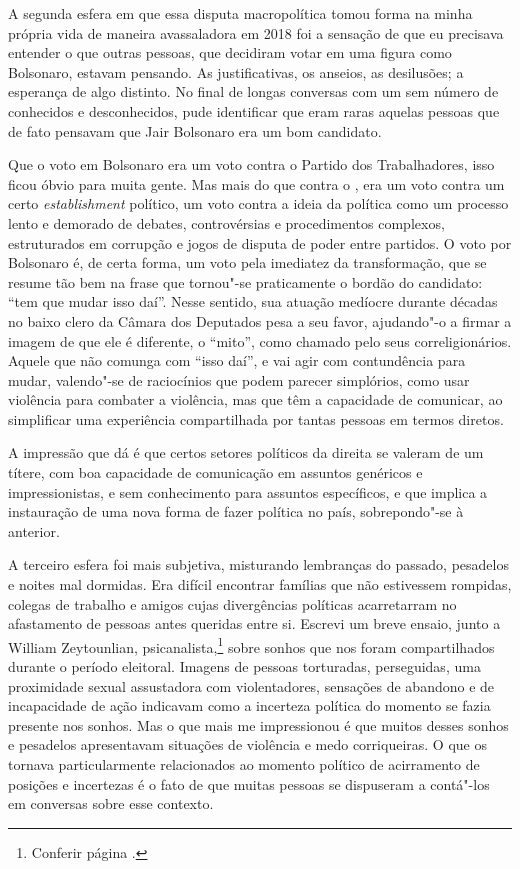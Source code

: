 A segunda esfera em que essa disputa macropolítica tomou forma na minha
própria vida de maneira avassaladora em 2018 foi a sensação de que eu
precisava entender o que outras pessoas, que decidiram votar em uma
figura como Bolsonaro, estavam pensando. As justificativas, os anseios,
as desilusões; a esperança de algo distinto. No final de longas
conversas com um sem número de conhecidos e desconhecidos, pude
identificar que eram raras aquelas pessoas que de fato pensavam que Jair
Bolsonaro era um bom candidato.

Que o voto em Bolsonaro era um voto contra o Partido dos Trabalhadores,
isso ficou óbvio para muita gente.
Mas mais do que contra o , era um voto contra um
certo \emph{establishment} político, um voto contra a ideia da política
como um processo lento e demorado de debates, controvérsias e
procedimentos complexos, estruturados em corrupção e jogos de disputa de
poder entre partidos. O voto por Bolsonaro é, de certa forma, um voto
pela imediatez da transformação, que se resume tão bem na frase que
tornou"-se praticamente o bordão do candidato: ``tem que mudar isso
daí''. Nesse sentido, sua atuação medíocre durante décadas no baixo
clero da Câmara dos Deputados pesa a seu favor, ajudando"-o a firmar a imagem de que
ele é diferente, o ``mito'', como chamado pelo seus correligionários.
Aquele que não comunga com ``isso daí'', e vai agir com contundência para
mudar, valendo"-se de raciocínios que podem parecer simplórios, como usar
violência para combater a violência, mas que têm a capacidade de
comunicar, ao simplificar uma experiência compartilhada por tantas
pessoas em termos diretos.

A impressão que dá é que certos setores
políticos da direita se valeram de um títere, com boa capacidade de
comunicação em assuntos genéricos e impressionistas, e sem conhecimento
para assuntos específicos, e que implica a instauração de uma nova
forma de fazer política no país, sobrepondo"-se à anterior.

A terceiro esfera foi mais subjetiva, misturando lembranças do passado,
pesadelos e noites mal dormidas. Era difícil encontrar famílias que não
estivessem rompidas, colegas de trabalho e amigos cujas divergências
políticas acarretarram no afastamento de pessoas antes queridas entre si.
Escrevi um breve ensaio, junto a William Zeytounlian, psicanalista,\footnote{Conferir página \pageref{sonhos}.} sobre sonhos
que nos foram compartilhados durante o período eleitoral. Imagens de
pessoas torturadas, perseguidas, uma proximidade sexual assustadora com
violentadores, sensações de abandono e de incapacidade de ação indicavam
como a incerteza política do momento se fazia presente nos sonhos. Mas o
que mais me impressionou é que muitos desses sonhos e pesadelos
apresentavam situações de violência e medo corriqueiras. O que os
tornava particularmente relacionados ao momento político de acirramento
de posições e incertezas é o fato de que muitas pessoas se dispuseram a
contá"-los em conversas sobre esse contexto.

